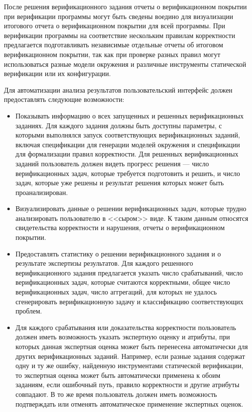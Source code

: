 \documentclass[%
candidate,     %
href,        %
colorlinks,  %
]{disser}
\begin{document}
После решения верификационного задания отчеты о верификационном покрытии при верификации программы могут быть сведены воедино для визуализации итогового отчета о верификационном покрытии для всей программы.
При верификации программы на соответствие нескольким правилам корректности предлагается подготавливать независимые отдельные отчеты об итоговом верификационном покрытии, так как при проверке разных правил могут использоваться разные модели окружения и различные инструменты статической верификации или их конфигурации.


Для автоматизации анализа результатов пользовательский интерфейс должен предоставлять следующие возможности:
\begin{itemize}
\item Показывать информацию о всех запущенных и решенных верификационных заданиях.
Для каждого задания должны быть доступны параметры, с которыми выполнялся запуск соответствующих верификационных заданий, включая спецификации для генерации моделей окружения и спецификации для формализации правил корректности.
Для решенных верификационных заданий пользователь должен видеть прогресс решения --- число верификационных задач, которые требуется подготовить и решить, и число задач, которые уже решены и результат решения которых может быть проанализирован.
\item Визуализировать данные о решении верификационных задач, которые трудно анализировать пользователю в <<сыром>> виде.
К таким данным относятся свидетельства корректности и нарушения, отчеты о верификационном покрытии.
\item Предоставлять статистику о решении верификационного задания и о результате экспертизы результатов.
Для каждого решенного верификационного задания предлагается указать число срабатываний, число верификационных задач, которые считаются корректными, общее число верификационных задач, число аггрегаций, для которых не удалось сгенерировать верификационную задачу и классификацию соответствующих проблем.
\item Для каждого срабатывания или доказательства корректности пользователь должен иметь возможность указать экспертную оценку и атрибуты, при которых данная экспертная оценка может быть перенесена автоматически для других верификационных заданий.
Например, если разные задания содержат одну и ту же ошибку, найденную инструментами статической верификации, то экспертная оценка может быть автоматически применена к обоим заданиям, если ошибочный путь, правило корректности и другие атрибуты совпадают.
В то же время пользователь должен иметь возможность подтверждать или отменять автоматическое применение экспертных оценок.

\end{itemize}
\end{document}
